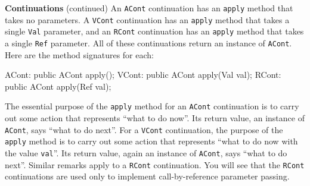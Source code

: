\begin{minipage}[t]{\sw}
\slidenumber
\LARGE
{\bf Continuations} (continued)\exx
An \verb'ACont' continuation has an \verb'apply' method
that takes no parameters.
A \verb'VCont' continuation has an \verb'apply' method
that takes a single \verb'Val' parameter,
and an \verb'RCont' continuation has an \verb'apply' method
that takes a single \verb'Ref' parameter.
All of these continuations return an instance of \verb'ACont'.
Here are the method signatures for each:
\begin{qv}
ACont: public ACont apply();
VCont: public ACont apply(Val val);
RCont: public ACont apply(Ref val);
\end{qv}
The essential purpose of the \verb'apply' method
for an \verb'ACont' continuation
is to carry out some action that represents
``what to do now''.
Its return value, an instance of \verb'ACont',
says ``what to do next''.\exx
For a \verb'VCont' continuation,
the purpose of the \verb'apply' method
is to carry out some action that represents
``what to do now with the value \verb'val'''.
Its return value, again an instance of \verb'ACont',
says ``what to do next''.
Similar remarks apply to a \verb'RCont' continuation.
You will see that the \verb'RCont' continuations are used only
to implement call-by-reference parameter passing.
\end{minipage}
